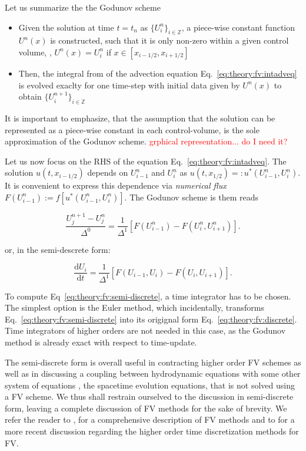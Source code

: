 Let us summarize the the Godunov scheme

\begin{itemize}
    \item Given the solution at time $t= t_n$ as $\{U_i ^n\}_{i\in\mathbb{Z}}$, a piece-wise constant function $U^n(x)$ is constructed, such that it is only non-zero within a given control volume, \ie, $U^n(x) = U_i ^n$ if $x\in[x_{i-1/2}, x_{i+1/2}]$
    \item Then, the integral from of the advection equation Eq.~\eqref{eq:theory:fv:intadveq} is evolved exaclty for one time-step with initial data given by $U^n(x)$ to obtain $\{U^{n+1}_i\}_{i\in\mathbb{Z}}$ 
\end{itemize}

It is important to emphasize, that the assumption that the solution can be represented as a piece-wise constant in each control-volume, is the sole approximation of the Godunov scheme. \textcolor{red}{grphical representation... do I need it?} 

Let us now focus on the \ac{RHS} of the equation Eq.~\eqref{eq:theory:fv:intadveq}. The solution $u(t, x_{i-1/2})$ depends on $U_{i-1} ^n$ and $U_{i} ^n$ as $u(t, x_{1/2}) =: u^* (U_{i-1}^{n}, U_{i}^n)$. It is convenient to express this dependence via \textit{numerical flux} $F(U_{i-1}^{n}):=f[u^*(U_{i-1}^{n}, U_{i}^{n})]$. The Godunov scheme is them reads

\begin{equation}
\frac{U_{j}^{n+1} - U_{j}^{n}}{\Delta^0} = \frac{1}{\Delta^1}[F(U_{i-1}^{n}) - F(U_{i}^{n}, U_{i+1}^{n})].
\label{eq:theory:fv:discrete}
\end{equation}

or, in the semi-descrete form:

\begin{equation}
\frac{\text{d}U_i}{\text{d} t} = \frac{1}{\Delta^1}[F(U_{i-1}, U_{i}) - F(U_i, U_{i+1})].
\label{eq:theory:fv:semi-discrete}
\end{equation}

To compute Eq~\eqref{eq:theory:fv:semi-discrete}, a time integrator has to be chosen. The simplest option is the Euler method, which incidentally, transforms Eq.~\eqref{eq:theory:fv:semi-discrete} into its origignal form Eq.~\eqref{eq:theory:fv:discrete}. Time integrators of higher orders are not needed in this case, as the Godunov method is already exact with respect to time-update. 

The semi-discrete form is overall useful in contracting higher order \ac{FV} schemes as well as in discussing a coupling between hydrodynamic equations with some other system of equations \eg, the spacetime evolution equations, that is not solved using a \ac{FV} scheme. We thus shall restrain ourselved to the discussion in semi-discrete form, leaving a complete discussion of \ac{FV} methods for the sake of brevity. 
We refer the reader to \eg, \citet{Toro:1999} for a comprehensive description of \ac{FV} methods and to \citet{Gassner:2011} for a more recent discussion regarding the higher order time discretization methods for \ac{FV}. 

